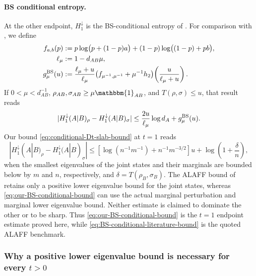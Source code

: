 \documentclass[11pt]{article}
\theoremstyle{remark}
\newcommand{\1}{\mathbbm{1}}
\begin{document}
\paragraph{BS conditional entropy.}
At the other endpoint, $H_1^\downarrow$ is the BS-conditional
entropy of \cite[Eq.~(3)]{bluhm2023continuity}.  For comparison with
\cite[Corollary~6.8]
{bluhm2023continuity}, we define
\begin{align}
 f_{a,b}(p)
 &:=p\log\bigl(p+(1-p)a\bigr)
 +(1-p)\log\bigl((1-p)+pb\bigr),\notag\\
 \ell_\mu&:=1-d_{AB}\mu,\notag\\
 g_\mu^{\rm BS}(u)
 &:=\frac{\ell_\mu+u}{\ell_\mu}
 \bigl(f_{\mu^{-1},\mu^{-1}}+\mu^{-1}h_2\bigr)
 \!\left(\frac{u}{\ell_\mu+u}\right).
 \label{eq:BS-conditional-literature-modulus}
\end{align}
If $0<\mu<d_{AB}^{-1}$, $\rho_{AB},\sigma_{AB}\geq\mu\1_{AB}$, and
$T(\rho,\sigma)\leq u$, that result reads
\begin{equation}
 |H_1^\downarrow(A|B)_\rho-H_1^\downarrow(A|B)_\sigma|
 \leq\frac{2u}{\ell_\mu}\log d_A+g_\mu^{\rm BS}(u).
 \label{eq:BS-conditional-literature-bound}
\end{equation}
Our bound \eqref{eq:conditional-Dt-slab-bound} at $t=1$ reads
\begin{equation}
 |H_1^\downarrow(A|B)_\rho-H_1^\downarrow(A|B)_\sigma|
 \leq
 \left[\log(n^{-1}m^{-1})+n^{-1}m^{-3/2}\right]u
 +\log\left(1+\frac{\delta}{n}\right),
 \label{eq:our-BS-conditional-bound}
\end{equation}
when the smallest eigenvalues of the joint states and their marginals
are bounded below by $m$ and $n$, respectively, and
$\delta=T(\rho_B,\sigma_B)$.  The ALAFF bound of
\cite[Corollary~6.8]{bluhm2023continuity} retains only a positive
lower eigenvalue bound for the joint states, whereas
\eqref{eq:our-BS-conditional-bound} can use the actual marginal
perturbation and marginal lower eigenvalue bound.  Neither estimate is claimed
to dominate the other or to be sharp.  Thus
\eqref{eq:our-BS-conditional-bound} is the $t=1$ endpoint estimate
proved here, while \eqref{eq:BS-conditional-literature-bound} is the
quoted ALAFF benchmark.

\subsubsection{Why a positive lower eigenvalue bound is necessary for every
\texorpdfstring{$t>0$}{t>0}}
\label{subsec:conditional-boundary-discontinuity}
\end{document}
